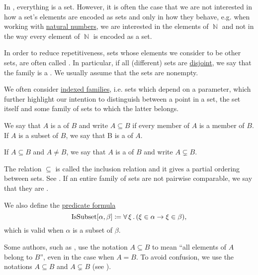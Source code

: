 \begin{remark}\label{rem:family_of_sets}
  In \hyperref[def:zfc]{}, everything is a set. However, it is often the case that we are not interested in how a set's elements are encoded as sets and only in how they behave, e.g. when working with \hyperref[def:set_of_natural_numbers]{natural numbers}, we are interested in the elements of \( \BbbN \) and not in the way every element of \( \BbbN \) is encoded as a set.

  In order to reduce repetitiveness, sets whose elements we consider to be other sets, are often called . In particular, if all (different) sets are \hyperref[def:subset]{disjoint}, we say that the family is a . We usually assume that the sets are nonempty.

  We often consider \hyperref[def:indexed_family]{indexed families}, i.e. sets which depend on a parameter, which further highlight our intention to distinguish between a point in a set, the set itself and some family of sets to which the latter belongs.
\end{remark}

\begin{definition}\label{def:subset}
  We say that \( A \) is a  of \( B \) and write \( A \subseteq B \) if every member of \( A \) is a member of \( B \). If \( A \) is a subset of \( B \), we say that B is a  of \( A \).

  If \( A \subseteq B \) and \( A \neq B \), we say that \( A \) is a  of \( B \) and write \( A \subsetneq B \).

  The relation \( \subseteq \) is called the inclusion relation and it gives a partial ordering between sets. See . If an entire family of sets are not pairwise comparable, we say that they are .

  We also define the \hyperref[rem:predicate_formula]{predicate formula}
  \begin{equation}\label{eq:def:basic_set_operations/successor/predicate}
    \operatorname{IsSubset}[\alpha, \beta] \coloneqq \forall \thinspace \xi \thinspace . \thinspace (\xi \in \alpha \rightarrow \xi \in \beta),
  \end{equation}
  which is valid when \( \alpha \) is a subset of \( \beta \).
\end{definition}

\begin{remark}\label{rem:subset_notation}
  Some authors, such as \cite{Kelley1955}, use the notation \( A \subseteq B \) to mean \enquote{all elements of \( A \) belong to \( B \)}, even in the case when \( A = B \). To avoid confusion, we use the notations \( A \subseteq B \) and \( A \subsetneq B \) (see ).
\end{remark}

